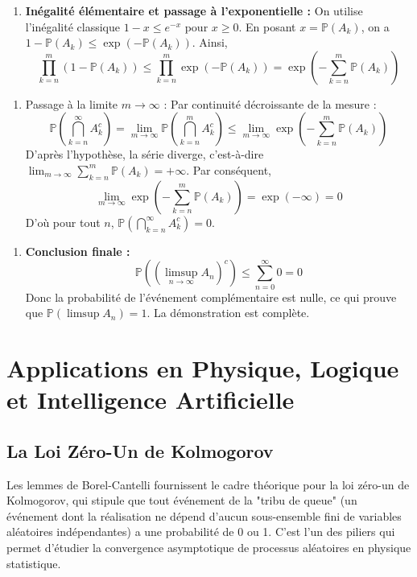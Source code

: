 \documentclass[11pt,a4paper]{article}
\begin{document}
\begin{enumerate}
\item \textbf{Inégalité élémentaire et passage à l'exponentielle :}
   On utilise l'inégalité classique $1 - x \le e^{-x}$ pour $x \ge 0$.
   En posant $x = \mathbb{P}(A_k)$, on a $1 - \mathbb{P}(A_k) \le \exp(-\mathbb{P}(A_k))$.
   Ainsi,
   $$ \prod_{k=n}^m (1 - \mathbb{P}(A_k)) \le \prod_{k=n}^m \exp(-\mathbb{P}(A_k)) = \exp\left( - \sum_{k=n}^m \mathbb{P}(A_k) \right) $$
\end{enumerate}

\begin{enumerate}
\item \textit{}Passage à la limite $m \to \infty$ :\textit{}
   Par continuité décroissante de la mesure :
   $$ \mathbb{P}\left( \bigcap_{k=n}^\infty A_k^c \right) = \lim_{m \to \infty} \mathbb{P}\left( \bigcap_{k=n}^m A_k^c \right) \le \lim_{m \to \infty} \exp\left( - \sum_{k=n}^m \mathbb{P}(A_k) \right) $$
   D'après l'hypothèse, la série diverge, c'est-à-dire $\lim_{m \to \infty} \sum_{k=n}^m \mathbb{P}(A_k) = +\infty$.
   Par conséquent,
   $$ \lim_{m \to \infty} \exp\left( - \sum_{k=n}^m \mathbb{P}(A_k) \right) = \exp(-\infty) = 0 $$
   D'où pour tout $n$, $\mathbb{P}\left( \bigcap_{k=n}^\infty A_k^c \right) = 0$.
\end{enumerate}

\begin{enumerate}
\item \textbf{Conclusion finale :}
   $$ \mathbb{P}\left( \left( \limsup_{n \to \infty} A_n \right)^c \right) \le \sum_{n=0}^\infty 0 = 0 $$
   Donc la probabilité de l'événement complémentaire est nulle, ce qui prouve que $\mathbb{P}(\limsup A_n) = 1$. La démonstration est complète.
\end{enumerate}


\section{Applications en Physique, Logique et Intelligence Artificielle}

\subsection{La Loi Zéro-Un de Kolmogorov}
Les lemmes de Borel-Cantelli fournissent le cadre théorique pour la loi zéro-un de Kolmogorov, qui stipule que tout événement de la "tribu de queue" (un événement dont la réalisation ne dépend d'aucun sous-ensemble fini de variables aléatoires indépendantes) a une probabilité de 0 ou 1. C'est l'un des piliers qui permet d'étudier la convergence asymptotique de processus aléatoires en physique statistique.
\end{document}
